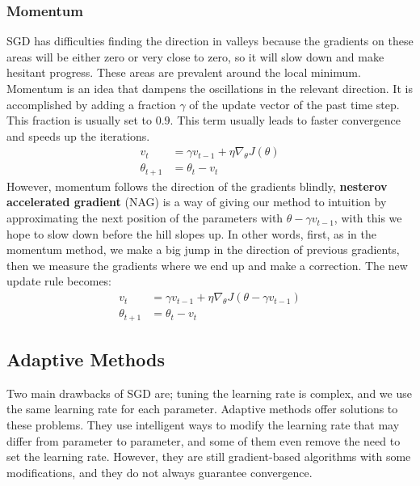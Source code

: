 \documentclass[a4paper, nobind]{templates/ociamthesis}
\begin{document}
\hypertarget{momentum}{%
\subsubsection{Momentum}\label{momentum}}

\noindent SGD has difficulties finding the direction in valleys because the gradients on these areas will be either zero or very close to zero, so it will slow down and make hesitant progress. These areas are prevalent around the local minimum. Momentum is an idea that dampens the oscillations in the relevant direction. It is accomplished by adding a fraction \(\gamma\) of the update vector of the past time step. This fraction is usually set to \(0.9\). This term usually leads to faster convergence and speeds up the iterations.
\[
\begin{aligned}
v_{t} &=\gamma v_{t-1}+\eta \nabla_{\theta} J(\theta) \\
\theta_{t+1} &=\theta_t-v_{t}
\end{aligned}
\]
However, momentum follows the direction of the gradients blindly, \textbf{nesterov accelerated gradient} (NAG) is a way of giving our method to intuition by approximating the next position of the parameters with \(\theta -\gamma v_{t-1}\), with this we hope to slow down before the hill slopes up. In other words, first, as in the momentum method, we make a big jump in the direction of previous gradients, then we measure the gradients where we end up and make a correction. The new update rule becomes:
\[
\begin{aligned} v_{t} &=\gamma v_{t-1}+\eta \nabla_{\theta} J\left(\theta-\gamma v_{t-1}\right) \\ 
\theta_{t+1} &=\theta_t-v_{t} \end{aligned}
\]

\hypertarget{adaptive-methods}{%
\subsection{Adaptive Methods}\label{adaptive-methods}}

Two main drawbacks of SGD are; tuning the learning rate is complex, and we use the same learning rate for each parameter. Adaptive methods offer solutions to these problems. They use intelligent ways to modify the learning rate that may differ from parameter to parameter, and some of them even remove the need to set the learning rate. However, they are still gradient-based algorithms with some modifications, and they do not always guarantee convergence.
\end{document}
